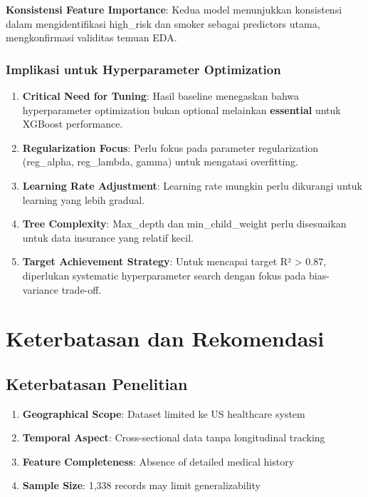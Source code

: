 \textbf{Konsistensi Feature Importance}: Kedua model menunjukkan konsistensi dalam mengidentifikasi high\_risk dan smoker sebagai predictors utama, mengkonfirmasi validitas temuan EDA.

\subsubsection{Implikasi untuk Hyperparameter Optimization}
\begin{enumerate}
    \item \textbf{Critical Need for Tuning}: Hasil baseline menegaskan bahwa hyperparameter optimization bukan optional melainkan \textbf{essential} untuk XGBoost performance.

    \item \textbf{Regularization Focus}: Perlu fokus pada parameter regularization (reg\_alpha, reg\_lambda, gamma) untuk mengatasi overfitting.

    \item \textbf{Learning Rate Adjustment}: Learning rate mungkin perlu dikurangi untuk learning yang lebih gradual.

    \item \textbf{Tree Complexity}: Max\_depth dan min\_child\_weight perlu disesuaikan untuk data insurance yang relatif kecil.

    \item \textbf{Target Achievement Strategy}: Untuk mencapai target R² > 0.87, diperlukan systematic hyperparameter search dengan fokus pada bias-variance trade-off.
\end{enumerate}

\section{Keterbatasan dan Rekomendasi}
\label{sec:keterbatasan}

\subsection{Keterbatasan Penelitian}
\label{subsec:keterbatasan}

\begin{enumerate}
    \item \textbf{Geographical Scope}: Dataset limited ke US healthcare system
    \item \textbf{Temporal Aspect}: Cross-sectional data tanpa longitudinal tracking
    \item \textbf{Feature Completeness}: Absence of detailed medical history
    \item \textbf{Sample Size}: 1,338 records may limit generalizability
\end{enumerate}

